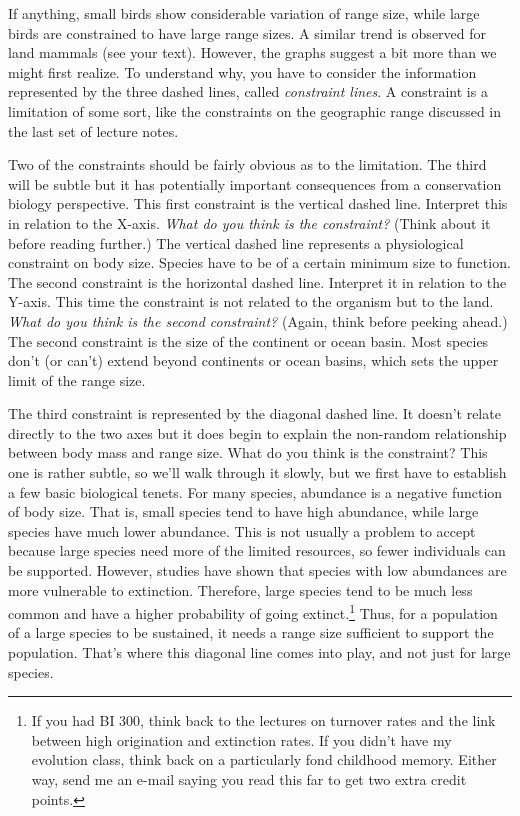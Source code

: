\documentclass[12pt, oneside]{article}   	%
\begin{document}
If anything, small birds show considerable variation of range size, while large birds are constrained to have large range sizes.  A similar trend is observed for land mammals (see your text).  However, the graphs suggest a bit more than we might first realize.  To understand why, you have to consider the information represented by the three dashed lines, called \emph{constraint lines}.   A constraint is a limitation of some sort, like the constraints on the geographic range discussed in the last set of lecture notes.
 
Two of the constraints should be fairly obvious as to the limitation.  The third will be subtle but it has potentially important consequences from a conservation biology perspective.  This first constraint is the vertical dashed line.  Interpret this in relation to the X-axis. \emph{What do you think is the constraint?} (Think about it before reading further.) The vertical dashed line represents a physiological constraint on body size.  Species have to be of a certain minimum size to function. The second constraint is the horizontal dashed line. Interpret it in relation to the Y-axis. This time the constraint is not related to the organism but to the land.  \emph{What do you think is the second constraint?} (Again, think before peeking ahead.)  The second constraint is the size of the continent or ocean basin.  Most species don't (or can't) extend beyond continents or ocean basins, which sets the upper limit of the range size.

The third constraint is represented by the diagonal dashed line.  It doesn't relate directly to the two axes but it does begin to explain the non-random relationship between body mass and range size. What do you think is the constraint? This one is rather subtle, so we'll walk through it slowly, but we first have to establish a few basic biological tenets.  For many species, abundance is a negative function of body size.  That is, small species tend to have high abundance, while large species have much lower abundance.  This is not usually a problem to accept because large species need more of the limited resources, so fewer individuals can be supported.  However, studies have shown that species with low abundances are more vulnerable to extinction.  Therefore, large species tend to be much less common and have a higher probability of going extinct.\footnote{If you had BI 300, think back to the lectures on turnover rates and the link between high origination and extinction rates.  If you didn't have my evolution class, think back on a particularly fond childhood memory.  Either way, send me an e-mail saying you read this far to get two extra credit points.}  Thus, for a population of a large species to be sustained, it needs a range size sufficient to support the population.  That's where this diagonal line comes into play, and not just for large species. 
 
\end{document}
